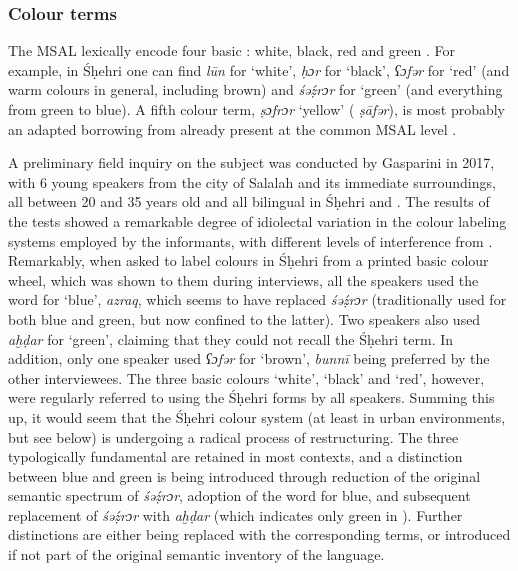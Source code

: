 \documentclass[output=paper]{langsci/langscibook}
\begin{document}
 \subsubsection{Colour terms}

The MSAL lexically encode four basic : white, black, red and green \citep[261--262]{Bulakh2004}. For example, in Śḥehri one can find \textit{lūn} for ‘white’, \textit{ḥɔr} for ‘black’, \textit{ʕɔfər} for ‘red’ (and warm colours in general, including brown) and \textit{śəẓ́rɔr} for ‘green’ (and everything from green to blue). A fifth colour term, \textit{ṣɔfrɔr} ‘yellow’ ( \textit{ṣāfər}), is most probably an adapted borrowing from  already present at the common MSAL level \citep[271]{Bulakh2004}. 

A preliminary field inquiry on the subject was conducted by Gasparini in 2017, with 6 young speakers from the city of Salalah and its immediate surroundings, all between 20 and 35 years old and all bilingual in Śḥehri and . The results of the tests showed a remarkable degree of idiolectal variation in the colour labeling systems employed by the informants, with different levels of interference from . Remarkably, when asked to label colours in Śḥehri from a printed basic colour wheel, which was shown to them during interviews, all the speakers used the  word for ‘blue’, \textit{azraq}, which seems to have replaced \textit{śəẓ́rɔr} (traditionally used for both blue and green, but now confined to the latter). Two speakers also used \textit{aḫḍar} for ‘green’, claiming that they could not recall the Śḥehri term. In addition, only one speaker used \textit{ʕɔfər} for ‘brown’,  \textit{bunnī} being preferred by the other interviewees. The three basic colours ‘white’, ‘black’ and ‘red’, however, were regularly referred to using the Śḥehri forms by all speakers. Summing this up, it would seem that the Śḥehri colour system (at least in urban environments, but see below) is undergoing a radical process of restructuring. The three typologically fundamental  are retained in most contexts, and a distinction between blue and green is being introduced through reduction of the original semantic spectrum of \textit{śəẓ́rɔr}, adoption of the  word for blue, and subsequent replacement of \textit{śəẓ́rɔr} with \textit{aḫḍar} (which indicates only green in ). Further distinctions are either being replaced with the corresponding  terms, or introduced if not part of the original semantic inventory of the language.
\end{document}
